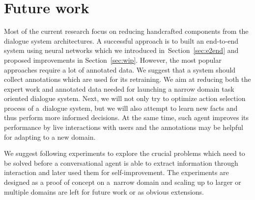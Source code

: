 \documentclass[11pt]{article}
\begin{document}
\section{Future work}\label{sec:future}

Most of the current research focus on reducing handcrafted components from the dialogue system architectures.
A successful approach is to built an end-to-end system using neural networks which we introduced in~Section~\ref{sec:e2end} and proposed improvements in Section~\ref{sec:wip}. 
However, the most popular approaches require a lot of annotated data.
We suggest that a system should collect annotations which are used for its retraining. 
We aim at reducing both the expert work and annotated data needed for launching a narrow domain task oriented dialogue system.
Next, we will not only try to optimize action selection process of a~dialogue system, but we will also attempt to learn new facts and thus perform more informed decisions.
At the same time, such agent improves its performance by live interactions with users and the annotations may be helpful for adapting to a new domain.

We suggest following experiments to explore the crucial problems which need to be solved before a conversational agent is able to extract information through interaction and later used them for self-improvement.
The experiments are designed as a proof of concept on a~narrow domain and scaling up to larger or multiple domains are left for future work or as obvious extensions. 
\end{document}
